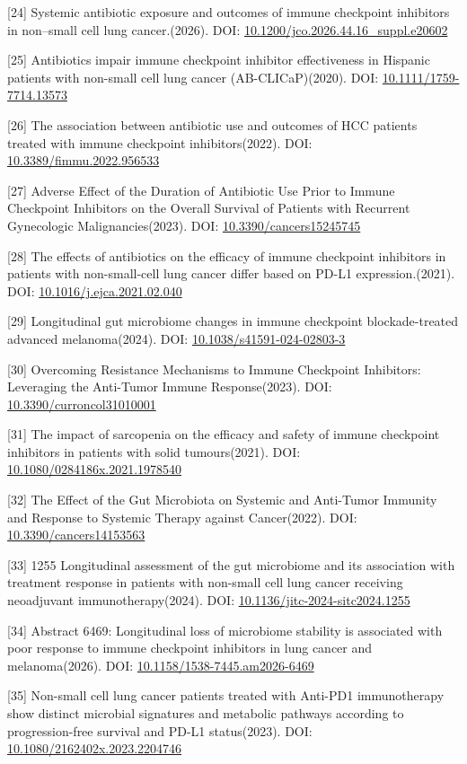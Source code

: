 \documentclass[11pt]{article}
\begin{document}
{[}24{]} Systemic antibiotic exposure and outcomes of immune checkpoint inhibitors in non--small cell lung cancer.(2026). DOI: \url{10.1200/jco.2026.44.16_suppl.e20602}

{[}25{]} Antibiotics impair immune checkpoint inhibitor effectiveness in Hispanic patients with non-small cell lung cancer (AB-CLICaP)(2020). DOI: \url{10.1111/1759-7714.13573}

{[}26{]} The association between antibiotic use and outcomes of HCC patients treated with immune checkpoint inhibitors(2022). DOI: \url{10.3389/fimmu.2022.956533}

{[}27{]} Adverse Effect of the Duration of Antibiotic Use Prior to Immune Checkpoint Inhibitors on the Overall Survival of Patients with Recurrent Gynecologic Malignancies(2023). DOI: \url{10.3390/cancers15245745}

{[}28{]} The effects of antibiotics on the efficacy of immune checkpoint inhibitors in patients with non-small-cell lung cancer differ based on PD-L1 expression.(2021). DOI: \url{10.1016/j.ejca.2021.02.040}

{[}29{]} Longitudinal gut microbiome changes in immune checkpoint blockade-treated advanced melanoma(2024). DOI: \url{10.1038/s41591-024-02803-3}

{[}30{]} Overcoming Resistance Mechanisms to Immune Checkpoint Inhibitors: Leveraging the Anti-Tumor Immune Response(2023). DOI: \url{10.3390/curroncol31010001}

{[}31{]} The impact of sarcopenia on the efficacy and safety of immune checkpoint inhibitors in patients with solid tumours(2021). DOI: \url{10.1080/0284186x.2021.1978540}

{[}32{]} The Effect of the Gut Microbiota on Systemic and Anti-Tumor Immunity and Response to Systemic Therapy against Cancer(2022). DOI: \url{10.3390/cancers14153563}

{[}33{]} 1255 Longitudinal assessment of the gut microbiome and its association with treatment response in patients with non-small cell lung cancer receiving neoadjuvant immunotherapy(2024). DOI: \url{10.1136/jitc-2024-sitc2024.1255}

{[}34{]} Abstract 6469: Longitudinal loss of microbiome stability is associated with poor response to immune checkpoint inhibitors in lung cancer and melanoma(2026). DOI: \url{10.1158/1538-7445.am2026-6469}

{[}35{]} Non-small cell lung cancer patients treated with Anti-PD1 immunotherapy show distinct microbial signatures and metabolic pathways according to progression-free survival and PD-L1 status(2023). DOI: \url{10.1080/2162402x.2023.2204746}
\end{document}
